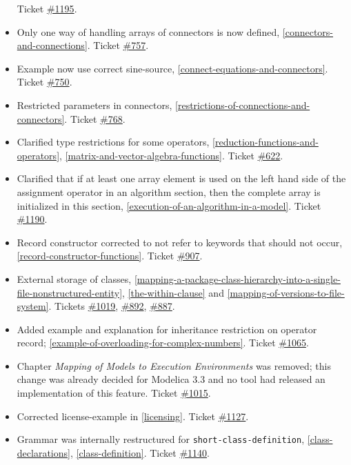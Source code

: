 \begin{itemize}
  Ticket \href{https://github.com/modelica/ModelicaSpecification/issues/1195}{\#1195}.
\item
  Only one way of handling arrays of connectors is now defined,
  \cref{connectors-and-connections}. Ticket \href{https://github.com/modelica/ModelicaSpecification/issues/757}{\#757}.
\item
  Example now use correct sine-source, \cref{connect-equations-and-connectors}. Ticket
  \href{https://github.com/modelica/ModelicaSpecification/issues/750}{\#750}.
\item
  Restricted parameters in connectors, \cref{restrictions-of-connections-and-connectors}. Ticket
  \href{https://github.com/modelica/ModelicaSpecification/issues/768}{\#768}.
\item
  Clarified type restrictions for some operators, \cref{reduction-functions-and-operators},
  \cref{matrix-and-vector-algebra-functions}. Ticket
  \href{https://github.com/modelica/ModelicaSpecification/issues/622}{\#622}.
\item
  Clarified that if at least one array element is used on the left hand
  side of the assignment operator in an algorithm section, then the
  complete array is initialized in this section, \cref{execution-of-an-algorithm-in-a-model}. Ticket
  \href{https://github.com/modelica/ModelicaSpecification/issues/1190}{\#1190}.
\item
  Record constructor corrected to not refer to keywords that should not
  occur, \cref{record-constructor-functions}. Ticket
  \href{https://github.com/modelica/ModelicaSpecification/issues/907}{\#907}.
\item
  External storage of classes, \cref{mapping-a-package-class-hierarchy-into-a-single-file-nonstructured-entity},
  \cref{the-within-clause} and \cref{mapping-of-versions-to-file-system}.
  Tickets \href{https://github.com/modelica/ModelicaSpecification/issues/1019}{\#1019},
  \href{https://github.com/modelica/ModelicaSpecification/issues/892}{\#892},
  \href{https://github.com/modelica/ModelicaSpecification/issues/887}{\#887}.
\item
  Added example and explanation for inheritance restriction on operator
  record; \cref{example-of-overloading-for-complex-numbers}. Ticket
  \href{https://github.com/modelica/ModelicaSpecification/issues/1065}{\#1065}.
\item
  Chapter \emph{Mapping of Models to Execution Environments} was removed;
  this change was already decided for Modelica 3.3 and no tool had
  released an implementation of this feature. Ticket
  \href{https://github.com/modelica/ModelicaSpecification/issues/1015}{\#1015}.
\item
  Corrected license-example in \cref{licensing}. Ticket
  \href{https://github.com/modelica/ModelicaSpecification/issues/1127}{\#1127}.
\item
  Grammar was internally restructured for \lstinline[language=grammar]!short-class-definition!, \cref{class-declarations}, \cref{class-definition}.
  Ticket \href{https://github.com/modelica/ModelicaSpecification/issues/1140}{\#1140}.
\end{itemize}

